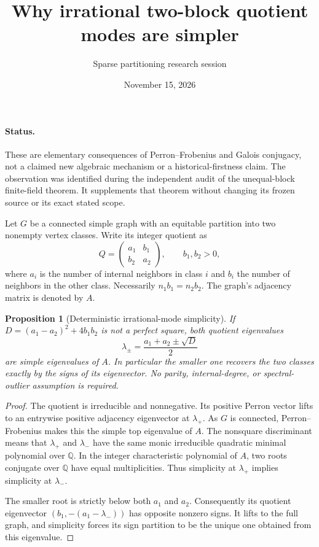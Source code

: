 \documentclass[11pt]{article}
\title{Why irrational two-block quotient modes are simpler}
\author{Sparse partitioning research session}
\date{November 15, 2026}
\newtheorem{proposition}{Proposition}
\begin{document}
\maketitle
\paragraph{Status.}
These are elementary consequences of Perron--Frobenius and Galois
conjugacy, not a claimed new algebraic mechanism or a historical-firstness
claim. The observation was identified during the independent audit of
the unequal-block finite-field theorem. It supplements that theorem
without changing its frozen source or its exact stated scope.

Let $G$ be a connected simple graph with an equitable partition into two
nonempty vertex classes. Write its integer quotient as
\[
 Q=\begin{pmatrix}a_1&b_1\\b_2&a_2\end{pmatrix},
 \qquad b_1,b_2>0,
\]
where $a_i$ is the number of internal neighbors in class $i$ and $b_i$
the number of neighbors in the other class. Necessarily
$n_1b_1=n_2b_2$. The graph's adjacency matrix is denoted by $A$.

\begin{proposition}[Deterministic irrational-mode simplicity]
If $D=(a_1-a_2)^2+4b_1b_2$ is not a perfect square, both quotient
eigenvalues
\[
 \lambda_\pm=\frac{a_1+a_2\pm\sqrt D}{2}
\]
are simple eigenvalues of $A$. In particular the smaller one recovers
the two classes exactly by the signs of its eigenvector. No parity,
internal-degree, or spectral-outlier assumption is required.
\end{proposition}
\begin{proof}
The quotient is irreducible and nonnegative. Its positive Perron vector
lifts to an entrywise positive adjacency eigenvector at $\lambda_+$.
As $G$ is connected, Perron--Frobenius makes this the simple top
eigenvalue of $A$. The nonsquare discriminant means that $\lambda_+$
and $\lambda_-$ have the same monic irreducible quadratic minimal
polynomial over $\mathbb Q$. In the integer characteristic polynomial
of $A$, two roots conjugate over $\mathbb Q$ have equal multiplicities.
Thus simplicity at $\lambda_+$ implies simplicity at $\lambda_-$.

The smaller root is strictly below both $a_1$ and $a_2$. Consequently
its quotient eigenvector
$(b_1,-(a_1-\lambda_-))$ has opposite nonzero signs. It lifts to the
full graph, and simplicity forces its sign partition to be the unique
one obtained from this eigenvalue.
\end{proof}
\end{document}
